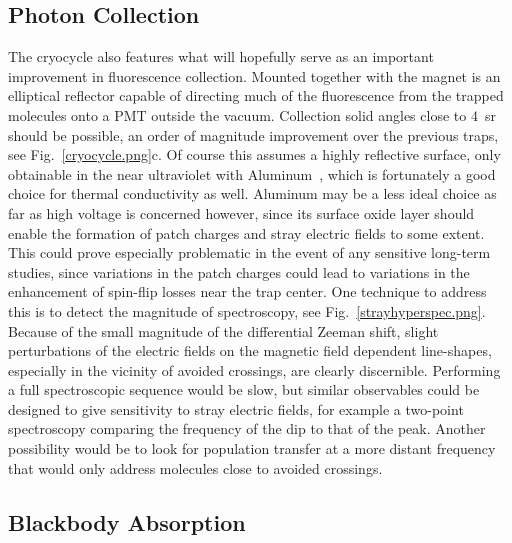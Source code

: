 \subsection{Photon Collection}

The cryocycle also features what will hopefully serve as an important improvement in fluorescence collection.
Mounted together with the magnet is an elliptical reflector capable of directing much of the fluorescence from the trapped molecules onto a PMT outside the vacuum.
Collection solid angles close to $4$~sr should be possible, an order of magnitude improvement over the previous traps, see Fig.~\ref{cryocycle.png}c.
Of course this assumes a highly reflective surface, only obtainable in the near ultraviolet with Aluminum~\cite{rumble2017crc}, which is fortunately a good choice for thermal conductivity as well.
Aluminum may be a less ideal choice as far as high voltage is concerned however, since its surface oxide layer should enable the formation of patch charges and stray electric fields to some extent.
This could prove especially problematic in the event of any sensitive long-term studies, since variations in the patch charges could lead to variations in the enhancement of spin-flip losses near the trap center.
One technique to address this is to detect the magnitude of spectroscopy, see Fig.~\ref{strayhyperspec.png}.
Because of the small magnitude of the differential Zeeman shift, slight perturbations of the electric fields on the magnetic field dependent line-shapes, especially in the vicinity of avoided crossings, are clearly discernible.
Performing a full spectroscopic sequence would be slow, but similar observables could be designed to give sensitivity to stray electric fields, for example a two-point spectroscopy comparing the frequency of the dip to that of the peak.
Another possibility would be to look for population transfer at a more distant frequency that would only address molecules close to avoided crossings.


\subsection{Blackbody Absorption}

